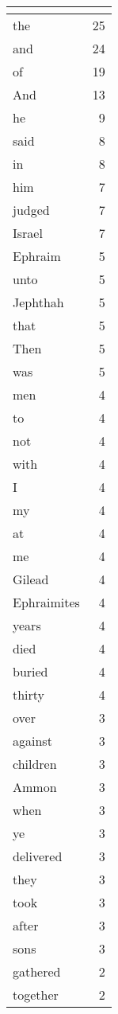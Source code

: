 \begin{center}
\begin{longtable}{l|r}
\hline \multicolumn{2}{c}{{ }} \\ \hline
\endfoot 
the & 25\\ \hline 
and & 24\\ \hline 
of & 19\\ \hline 
And & 13\\ \hline 
he & 9\\ \hline 
said & 8\\ \hline 
in & 8\\ \hline 
him & 7\\ \hline 
judged & 7\\ \hline 
Israel & 7\\ \hline 
Ephraim & 5\\ \hline 
unto & 5\\ \hline 
Jephthah & 5\\ \hline 
that & 5\\ \hline 
Then & 5\\ \hline 
was & 5\\ \hline 
men & 4\\ \hline 
to & 4\\ \hline 
not & 4\\ \hline 
with & 4\\ \hline 
I & 4\\ \hline 
my & 4\\ \hline 
at & 4\\ \hline 
me & 4\\ \hline 
Gilead & 4\\ \hline 
Ephraimites & 4\\ \hline 
years & 4\\ \hline 
died & 4\\ \hline 
buried & 4\\ \hline 
thirty & 4\\ \hline 
over & 3\\ \hline 
against & 3\\ \hline 
children & 3\\ \hline 
Ammon & 3\\ \hline 
when & 3\\ \hline 
ye & 3\\ \hline 
delivered & 3\\ \hline 
they & 3\\ \hline 
took & 3\\ \hline 
after & 3\\ \hline 
sons & 3\\ \hline 
gathered & 2\\ \hline 
together & 2\\ \hline 

\end{longtable}
\end{center}
